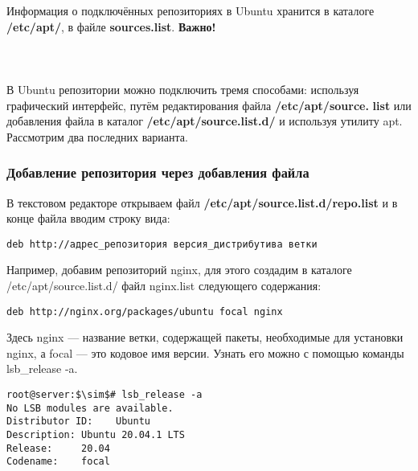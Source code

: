 \documentclass[14pt, a4paper]{article}
\begin{document}
Информация о подключённых репозиториях в Ubuntu хранится в каталоге \textbf{/etc/apt/}, в файле
\textbf{sources.list}. \textbf{Важно!}  \\ 
 \\
 \\
\\

В Ubuntu репозитории можно подключить тремя способами: используя графический интерфейс, путём
редактирования файла \textbf{/etc/apt/source.} \textbf{list} или добавления файла в каталог \textbf{/etc/apt/source.list.d/} и
используя утилиту apt. Рассмотрим два последних варианта.

\subsubsection*{Добавление репозитория через добавления файла} 

В текстовом редакторе открываем файл \textbf{/etc/apt/source.list.d/repo.list} и в конце файла вводим строку
вида:

\vspace{0.3cm}
\begin{lstlisting}
deb http://адрес_репозитория версия_дистрибутива ветки
\end{lstlisting}
\vspace{0.2cm}

Например, добавим репозиторий nginx, для этого создадим в каталоге /etc/apt/source.list.d/ файл
nginx.list следующего содержания:

\vspace{0.3cm}
\begin{lstlisting}
deb http://nginx.org/packages/ubuntu focal nginx
\end{lstlisting}
\vspace{0.2cm}

Здесь nginx — название ветки, содержащей пакеты, необходимые для установки nginx, а focal — это
кодовое имя версии. Узнать его можно с помощью команды \colorbox{backcolour}{lsb\_release -a}.

\vspace{0.3cm}
\begin{lstlisting}
root@server:$\sim$# lsb_release -a
No LSB modules are available.
Distributor ID:    Ubuntu
Description: Ubuntu 20.04.1 LTS
Release:     20.04
Codename:    focal
\end{lstlisting}
\vspace{0.2cm}
\end{document}
